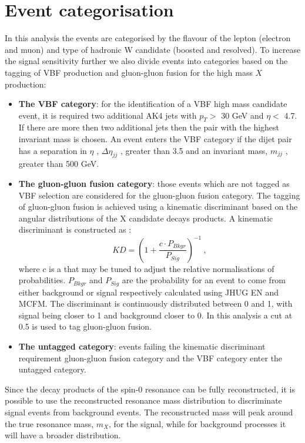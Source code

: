 \section{Event categorisation}
In this analysis the events are categorised by the flavour of the lepton (electron and muon)
and type of hadronic W candidate (boosted and resolved). To increase the signal sensitivity
further we also divide events into categories based on the tagging of VBF  production and
gluon-gluon fusion for the high mass $X$ production:
\begin{itemize}
\item {\bf The VBF category}: for the identification of a VBF high mass candidate event, it is required two additional AK4 jets
with $p_T>$ 30 GeV and $\eta <$ 4.7. If there are more then two additional jets then the pair with
the highest invariant mass is chosen. An event enters the VBF category if the dijet pair has a
separation in $\eta$ ,  $\Delta \eta_{jj}$ , greater than 3.5 and an invariant mass, $m_{jj}$ , greater than 500 GeV.
\item {\bf The gluon-gluon fusion category}: those events which are not tagged as VBF selection are considered for the gluon-gluon fusion category. 
The tagging of gluon-gluon fusion  is achieved
using a kinematic discriminant based on the angular distributions of the X candidate decays
products. A kinematic discriminant is constructed as :
\begin{equation}
KD=(1+\frac{c \cdot P_{Bkgr}}{P_{Sig}})^{-1} \: , \end{equation}
where $c$ is a that  may be tuned to adjust the relative normalisations of probabilities. 
$ P_{Bkgr}$ and $P_{Sig}$  are the probability for an event to come from either background or signal respectively calculated using JHUG EN and MCFM.
The discriminant is continuously distributed between 0 and 1, with signal being closer to 1 and background closer to 0. 
In this analysis a cut at 0.5 is used to tag gluon-gluon fusion.
\item {\bf The untagged category}: events failing the   kinematic discriminant requirement  gluon-gluon fusion category and the  VBF category 
enter the untagged category.
\end{itemize}
Since the decay products of the spin-0 resonance can be fully reconstructed, it is possible to use
the reconstructed resonance mass distribution to discriminate signal events from background
events. The reconstructed mass will peak around the true resonance mass, $m_X$, for the signal,
while for background processes it will have a broader distribution.\\ 
